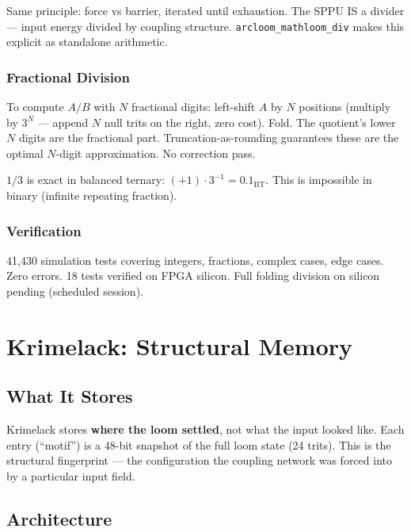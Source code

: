 \documentclass[11pt,a4paper]{article}
\begin{document}
Same principle: force vs barrier, iterated until exhaustion. The SPPU IS a divider --- input energy divided by coupling structure. \texttt{arcloom\_mathloom\_div} makes this explicit as standalone arithmetic.

\subsubsection{Fractional Division}

To compute $A/B$ with $N$ fractional digits: left-shift $A$ by $N$ positions (multiply by $3^N$ --- append $N$ null trits on the right, zero cost). Fold. The quotient's lower $N$ digits are the fractional part. Truncation-as-rounding guarantees these are the optimal $N$-digit approximation. No correction pass.

$1/3$ is exact in balanced ternary: $(+1) \cdot 3^{-1} = 0.1_{\text{BT}}$. This is impossible in binary (infinite repeating fraction).

\subsubsection{Verification}

41,430 simulation tests covering integers, fractions, complex cases, edge cases. Zero errors. 18 tests verified on FPGA silicon. Full folding division on silicon pending (scheduled session).

\section{Krimelack: Structural Memory}

\subsection{What It Stores}

Krimelack stores \textbf{where the loom settled}, not what the input looked like. Each entry (``motif'') is a 48-bit snapshot of the full loom state (24 trits). This is the structural fingerprint --- the configuration the coupling network was forced into by a particular input field.

\subsection{Architecture}
\end{document}

